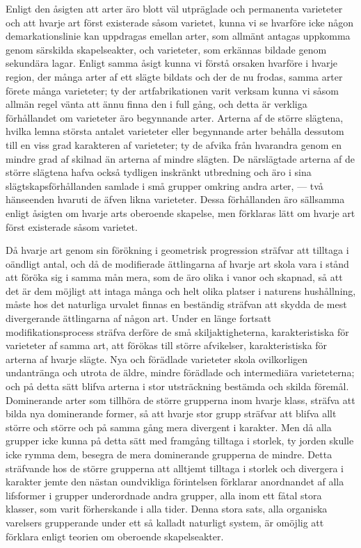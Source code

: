 Enligt den åsigten att arter äro blott väl utpräglade och permanenta varieteter och att hvarje art först existerade såsom varietet, kunna vi se hvarföre icke någon demarkationslinie kan uppdragas emellan arter, som allmänt antagas uppkomma genom särskilda skapelseakter, och varieteter, som erkännas bildade genom sekundära lagar. Enligt samma åsigt kunna vi förstå orsaken hvarföre i hvarje region, der många arter af ett slägte bildats och der de nu frodas, samma arter förete många varieteter; ty der artfabrikationen varit verksam kunna vi såsom allmän regel vänta att ännu finna den i full gång, och detta är verkliga förhållandet om varieteter äro begynnande arter. Arterna af de större slägtena, hvilka lemna största antalet varieteter eller begynnande arter behålla dessutom till en viss grad karakteren af varieteter; ty de afvika från hvarandra genom en mindre grad af skilnad än arterna af mindre slägten. De närslägtade arterna af de större slägtena hafva också tydligen inskränkt utbredning och äro i sina slägtskapsförhållanden samlade i små grupper omkring andra arter, — två hänseenden hvaruti de äfven likna varieteter. Dessa förhållanden äro sällsamma enligt åsigten om hvarje arts oberoende skapelse, men förklaras lätt om hvarje art först existerade såsom varietet.

Då hvarje art genom sin förökning i geometrisk progression sträf\-var att tilltaga i oändligt antal, och då de modifierade ättlingarna af hvarje art skola vara i stånd att föröka sig i samma mån mera, som de äro olika i vanor och skapnad, så att det är dem möjligt att intaga många och helt olika platser i naturens hushållning, måste hos det naturliga urvalet finnas en beständig sträfvan att skydda de mest divergerande ättlingarna af någon art. Under en länge fortsatt modifikationsprocess sträfva derföre de små skiljaktigheterna, karakteristiska för varieteter af samma art, att förökas till större afvikelser, karakteristiska för arterna af hvarje slägte. Nya och förädlade varieteter skola ovilkorligen undantränga och utrota de äldre, mindre förädlade och intermediära varieteterna; och på detta sätt blifva arterna i stor utsträckning bestämda och skilda föremål. Dominerande arter som tillhöra de större grupperna inom hvarje klass, sträfva att bilda nya dominerande former, så att hvarje stor grupp sträfvar att blifva allt större och större och på samma gång mera divergent i karakter. Men då alla grupper icke kunna på detta sätt med framgång tilltaga i storlek, ty jorden skulle icke rymma dem, besegra de mera dominerande grupperna de mindre. Detta sträfvande hos de större grupperna att alltjemt tilltaga i storlek och divergera i karakter jemte den nästan oundvikliga förintelsen förklarar anordnandet af alla lifsformer i grupper underordnade andra grupper, alla inom ett fåtal stora klasser, som varit förherskande i alla tider. Denna stora sats, alla organiska varelsers grupperande under ett så kalladt naturligt system, är omöjlig att förklara enligt teorien om oberoende skapelseakter.


